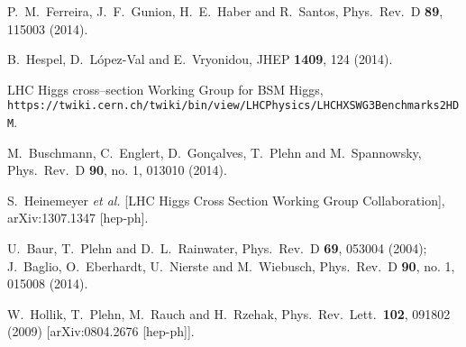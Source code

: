   P.~M.~Ferreira, J.~F.~Gunion, H.~E.~Haber and R.~Santos,
  Phys.\ Rev.\ D {\bf 89}, 115003 (2014).

  B.~Hespel, D.~L\'opez-Val and E.~Vryonidou,
  JHEP {\bf 1409}, 124 (2014).  
  
 LHC Higgs cross--section Working Group for BSM Higgs, \\
  \texttt{https://twiki.cern.ch/twiki/bin/view/LHCPhysics/LHCHXSWG3Benchmarks2HDM}.

  M.~Buschmann, C.~Englert, D.~Gon\c{c}alves, T.~Plehn and M.~Spannowsky,
  Phys.\ Rev.\ D {\bf 90}, no. 1, 013010 (2014).

  S.~Heinemeyer {\it et al.} [LHC Higgs Cross Section Working Group Collaboration],
  arXiv:1307.1347 [hep-ph].

  U.~Baur, T.~Plehn and D.~L.~Rainwater,
  Phys.\ Rev.\ D {\bf 69}, 053004 (2004);
  J.~Baglio, O.~Eberhardt, U.~Nierste and M.~Wiebusch,
  Phys.\ Rev.\ D {\bf 90}, no. 1, 015008 (2014).

  W.~Hollik, T.~Plehn, M.~Rauch and H.~Rzehak,
  Phys.\ Rev.\ Lett.\  {\bf 102}, 091802 (2009)
  [arXiv:0804.2676 [hep-ph]].

